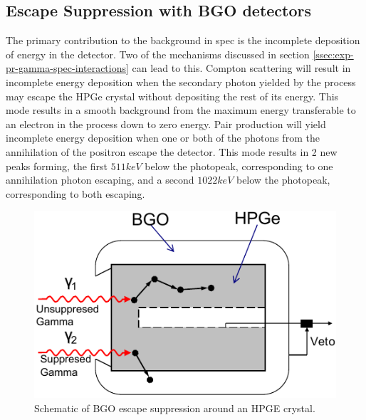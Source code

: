 \subsection{Escape Suppression with BGO detectors}
\label{ssec:exp-pr-gamma-spec-escape-supress}
The primary contribution to the background in \gr{} spec is the incomplete deposition of energy in the detector. Two of the mechanisms discussed in section \ref{ssec:exp-pr-gamma-spec-interactions} can lead to this. Compton scattering will result in incomplete energy deposition when the secondary photon yielded by the process may escape the HPGe crystal without depositing the rest of its energy. This mode results in a smooth background from the maximum energy transferable to an electron in the process down to zero energy. Pair production will yield incomplete energy deposition when one or both of the photons from the annihilation of the positron escape the detector. This mode results in 2 new peaks forming, the first $511keV$ below the photopeak, corresponding to one annihilation photon escaping, and a second $1022keV$ below the photopeak, corresponding to both escaping.
\begin{figure}[h!]
	\centerline{\includegraphics[height=0.25\textheight]{./img/c3/BGO_schematic.pdf}}
	\caption{Schematic of BGO escape suppression around an HPGE crystal.}
	\label{fig:chp3-supression-schematic}
\end{figure}

